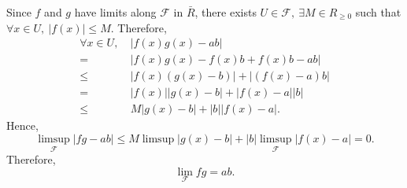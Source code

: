 \begin{proofenv}
    Since $f$ and $g$ have limits along $\mathcal{F}$ in $\bar{R}$, there exists $U\in \mathcal{F}, \ \exists M\in R_{\ge 0}$ such that $\forall x\in U,\ \left|f(x)\right|\le M$. Therefore,
    \begin{align*}
        \forall x\in U,\ &\left|f(x)g(x)-ab\right|\\
        =&\left|f(x)g(x)-f(x)b+f(x)b-ab\right|\\
        \le& \left|f(x)\left(g(x)-b\right)\right|+\left|\left(f(x)-a\right)b\right|\\
        =& \left|f(x)\right|\left|g(x)-b\right|+\left|f(x)-a\right| \left|b\right|\\
        \le &M \left|g(x)-b\right|+\left|b\right|\left|f(x)-a\right|.
    \end{align*}
    Hence,
    $$\limsup_{\mathcal{F}}\left|fg-ab\right|\le M\limsup\left|g(x)-b\right|+\left|b\right|\limsup_{\mathcal{F}}\left|f(x)-a\right|=0.$$
    Therefore, 
    $$\lim_{\mathcal{F}}fg=ab.$$
\end{proofenv}

